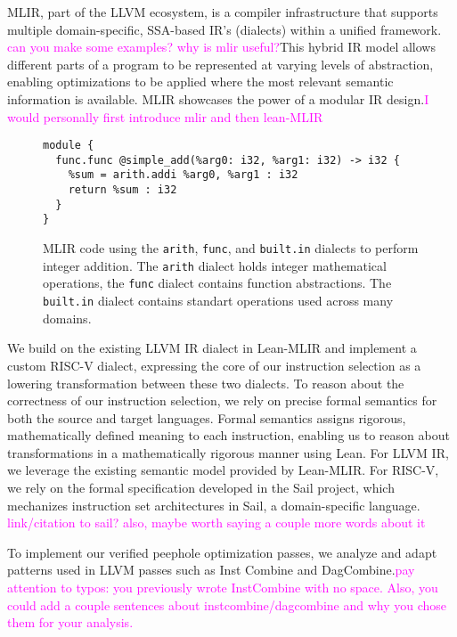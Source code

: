 MLIR, part of the LLVM ecosystem, is a compiler infrastructure that supports multiple domain-specific, SSA-based IR's (dialects) within a unified framework. \textcolor{magenta}{can you make some examples? why is mlir useful?}This hybrid IR model allows different parts of a program to be represented at varying levels of abstraction, enabling optimizations to be applied where the most relevant semantic information is available. MLIR showcases the power of a modular IR design.\textcolor{magenta}{I would personally first introduce mlir and then lean-MLIR}

\begin{figure}[ht]
\centering
\begin{lstlisting}[language=mlir, basicstyle=\ttfamily\small]
module {
  func.func @simple_add(%arg0: i32, %arg1: i32) -> i32 {
    %sum = arith.addi %arg0, %arg1 : i32
    return %sum : i32
  }
}

\end{lstlisting}
\caption{ MLIR code using the \texttt{arith}, \texttt{func},  and \texttt{built.in} dialects to perform integer addition. The \texttt{arith} dialect holds integer mathematical operations, the \texttt{func} dialect contains function abstractions. The \texttt{built.in} dialect contains standart operations used across many domains.}
\label{fig:mlir-addition}
\end{figure}

We build on the existing LLVM IR dialect in Lean-MLIR and implement a custom RISC-V dialect, expressing the core of our instruction selection as a lowering transformation between these two dialects. To reason about the correctness of our instruction selection, we rely on precise formal semantics for both the source and target languages. Formal semantics assigns rigorous, mathematically defined meaning to each instruction, enabling us to reason about transformations in a mathematically rigorous manner using Lean. For LLVM IR, we leverage the existing semantic model provided by Lean-MLIR. For RISC-V, we rely on the formal specification developed in the Sail project, which mechanizes instruction set architectures in Sail, a domain-specific language. \textcolor{magenta}{link/citation to sail? also, maybe worth saying a couple more words about it}

To implement our verified peephole optimization passes, we analyze and adapt patterns used in LLVM passes such as Inst Combine and DagCombine.\textcolor{magenta}{pay attention to typos: you previously wrote InstCombine with no space. Also, you could add a couple sentences about instcombine/dagcombine and why you chose them for your analysis.}


